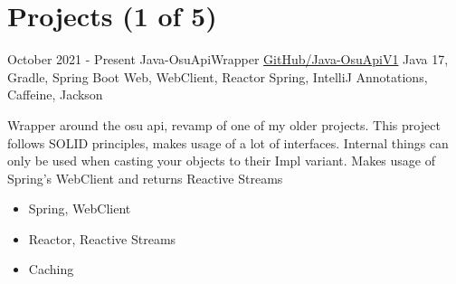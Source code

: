 \documentclass[letterpaper]{twentysecondcv} %
\begin{document}

\section{Projects (1 of 5)}
\begin{twenty} %
	\twentyitem
    		{October 2021 -}
		{Present}
        		{Java-OsuApiWrapper}
        		{\href{https://github.com/Tais993/Java-OsuApiV1/}{GitHub/Java-OsuApiV1}}
        		{Java 17, Gradle, Spring Boot Web, WebClient, Reactor Spring, IntelliJ Annotations, Caffeine, Jackson}
        		{
        		Wrapper around the osu api, revamp of one of my older projects.
        		This project follows SOLID principles, makes usage of a lot of interfaces.
        		Internal things can only be used when casting your objects to their Impl variant.
        		Makes usage of Spring's WebClient and returns Reactive Streams
        		\begin{itemize}
        		    \item Spring, WebClient
        		    \item Reactor, Reactive Streams
        		    \item Caching
                \end{itemize}}\\
\end{twenty}

\newpage

\makesidebarSecond %

\end{document}
